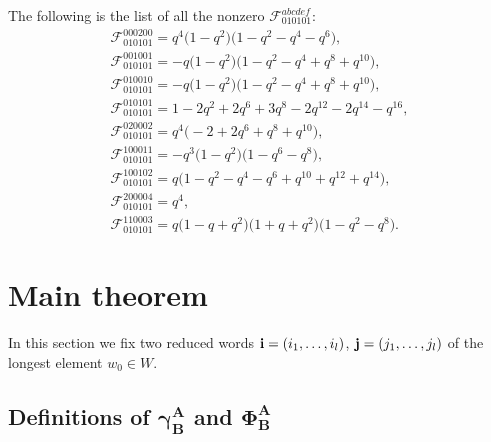 \documentclass[pdftex]{sigma}
\begin{document}
\begin{example}
The following is the list of all the nonzero $\mathscr{F}^{abcdef}_{010101}$:
\begin{gather*}
\mathscr{F}^{000200}_{010101}
  = q^4 \big(1 - q^2\big) \big(1 - q^2 - q^4 - q^6\big),
\\
\mathscr{F}^{001001}_{010101}
  = -q \big(1 - q^2\big) \big(1 - q^2 - q^4 + q^8 + q^{10}\big), \\
\mathscr{F}^{010010}_{010101}
 = -q \big(1 - q^2\big) \big(1 - q^2 - q^4 + q^8 + q^{10}\big),
\\
\mathscr{F}^{010101}_{010101}
 =  1 - 2 q^2 + 2 q^6 + 3 q^8 - 2 q^{12} - 2 q^{14} - q^{16}, \\
\mathscr{F}^{020002}_{010101}
 =  q^4 \big({-}2 + 2 q^6 + q^8 + q^{10}\big),
\\
\mathscr{F}^{100011}_{010101}
 = -q^3 \big(1 - q^2\big) \big(1 - q^6 - q^8\big), \\
\mathscr{F}^{100102}_{010101}
 =  q \big(1 - q^2 - q^4 - q^6 + q^{10} + q^{12} + q^{14}\big),
\\
\mathscr{F}^{200004}_{010101}  = q^4, \\
\mathscr{F}^{11000 3}_{010101}
 = q \big(1 - q + q^2\big) \big(1 + q + q^2\big) \big(1 - q^2 - q^8\big).
\end{gather*}
\end{example}


\section{Main theorem}\label{a:sec5}

In this section we f\/ix two reduced words ${\bf i}=(i_1,\ldots,i_l)$,
${\bf j}=(j_1,\ldots,j_l)$ of the longest element $w_0\in W$.

\subsection[Definitions of $\gamma^A_B$ and $\Phi^A_B$]{Def\/initions of $\boldsymbol{\gamma^A_B}$ and $\boldsymbol{\Phi^A_B}$}
\end{document}
